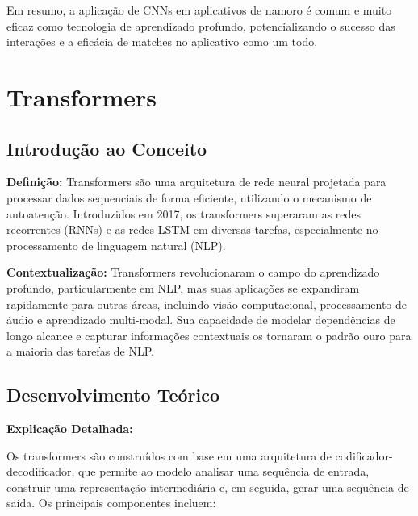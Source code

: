 Em resumo, a aplicação de CNNs em aplicativos de namoro é comum e muito eficaz como tecnologia de aprendizado profundo, potencializando o sucesso das interações e a eficácia de matches no aplicativo como um todo.


\section{Transformers}

\subsection{Introdução ao Conceito}
\textbf{}

\textbf{Definição:}  
Transformers são uma arquitetura de rede neural projetada para processar dados sequenciais de forma eficiente, utilizando o mecanismo de autoatenção. Introduzidos em 2017, os transformers superaram as redes recorrentes (RNNs) e as redes LSTM em diversas tarefas, especialmente no processamento de linguagem natural (NLP).

\textbf{Contextualização:}  
Transformers revolucionaram o campo do aprendizado profundo, particularmente em NLP, mas suas aplicações se expandiram rapidamente para outras áreas, incluindo visão computacional, processamento de áudio e aprendizado multi-modal. Sua capacidade de modelar dependências de longo alcance e capturar informações contextuais os tornaram o padrão ouro para a maioria das tarefas de NLP.

\subsection{Desenvolvimento Teórico}

\textbf{Explicação Detalhada:}

Os transformers são construídos com base em uma arquitetura de codificador-decodificador, que permite ao modelo analisar uma sequência de entrada, construir uma representação intermediária e, em seguida, gerar uma sequência de saída. Os principais componentes incluem:

